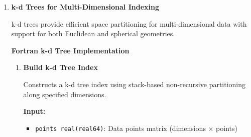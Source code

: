 \begin{enumerate}
\begin{enumerate}
\begin{itemize}
                    \item \texttt{num\_values integer(int32)}: Number of elements
                          
                    \item \texttt{lower\_bound, upper\_bound real(real64)}: Range boundaries
                  \end{itemize}
                  \textbf{Output:}
                  \begin{itemize}
                    \item \texttt{output\_indices integer(int32)}: Indices of matching values
                          (1-based)
                          
                    \item \texttt{num\_matches integer(int32)}: Number of matches found
                          
                    \item \texttt{ierr integer(int32)}: Error code
                  \end{itemize}
                  \begin{lstlisting}[language=Fortran]
call bst_range_query(values, sorted_indices, num_values, &
                    lower_bound, upper_bound, output_indices, &
                    num_matches, ierr)
                  \end{lstlisting}
          \end{enumerate}
          
    \item \textbf{k-d Trees for Multi-Dimensional Indexing} \label{sec:kd_trees}
          
          k-d trees provide efficient space partitioning for multi-dimensional data with
          support for both Euclidean and spherical geometries.
          
          \textbf{Fortran k-d Tree Implementation}
          
          \begin{enumerate}
            \item \textbf{Build k-d Tree Index}
                  
                  Constructs a k-d tree index using stack-based non-recursive partitioning
                  along specified dimensions.
                  
                  \textbf{Input:}
                  \begin{itemize}
                    \item \texttt{points real(real64)}: Data points matrix (dimensions ×
                          points)
                          

\end{itemize}
\end{enumerate}
\end{enumerate}
